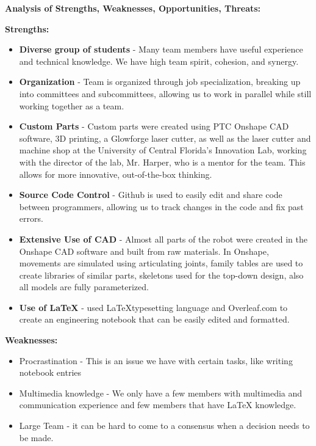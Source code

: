 \textbf{Analysis of Strengths, Weaknesses, Opportunities, Threats:}
\vspace{.2cm}

\textbf{Strengths:} 
\begin{itemize}
\item \textbf{Diverse group of students} - Many team members have useful experience and technical knowledge.
We have high team spirit, cohesion, and synergy.
\item \textbf{Organization} - Team is organized through job specialization, breaking up into committees and subcommittees, allowing us to work in parallel while still working together as a team. 
\item \textbf{Custom Parts} - Custom parts were created using PTC Onshape CAD software, 3D printing, a Glowforge laser cutter, as well as the laser cutter and machine shop at the University of Central Florida’s Innovation Lab, working with the director of the lab, Mr. Harper, who is a mentor for the team. This allows for more innovative, out-of-the-box thinking.
\item \textbf{Source Code Control} - Github is used to easily edit and share code between programmers, allowing us to track changes in the code and fix past errors. 
\item \textbf{Extensive Use of CAD} - Almost all parts of the robot were created in the Onshape CAD software and built from raw materials. In Onshape, movements are simulated using articulating joints, family tables are used to create libraries of similar parts, skeletons used for the top-down design, also all models are fully parameterized.
\item \textbf{Use of \LaTeX} - used \LaTeX typesetting language and Overleaf.com to create an engineering notebook that can be easily edited and formatted.
\end{itemize}

\textbf{Weaknesses:} 
\begin{itemize}
\item Procrastination - This is an issue we have with certain tasks, like writing notebook entries
\item Multimedia knowledge - We only have a few members with multimedia and communication experience and few members that have LaTeX knowledge.
\item Large Team - it can be hard to come to a consensus when a decision needs to be made.

\end{itemize}

